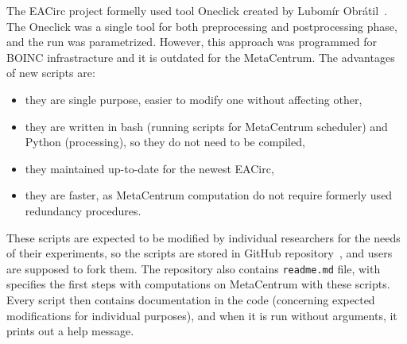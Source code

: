 \documentclass[
  print, %
  Table,   %
  nolof,     %
  nolot,     %
  11pt, %
  oneside  %
]{fithesis3}
\begin{document}
The EACirc project formelly used tool Oneclick created by Lubomír Obrátil~\cite{obratilBcThesis}. The Oneclick was a single tool for both preprocessing and postprocessing phase, and the run was parametrized. However, this approach was programmed for BOINC infrastracture and it is outdated for the MetaCentrum. The advantages of new scripts are: 

\begin{itemize}
    \item they are single purpose, easier to modify one without affecting other,
    \item they are written in bash (running scripts for MetaCentrum scheduler) and Python (processing), so they do not need to be compiled,
    \item they maintained up-to-date for the newest EACirc,
    \item they are faster, as MetaCentrum computation do not require formerly used redundancy procedures.
\end{itemize}

These scripts are expected to be modified by individual researchers for the needs of their experiments, so the scripts are stored in GitHub repository~\cite{eaUtils}, and users are supposed to fork them. The repository also contains \texttt{readme.md} file, with specifies the first steps with computations on MetaCentrum with these scripts. Every script then contains documentation in the code (concerning expected modifications for individual purposes), and when it is run without arguments, it prints out a help message.
\end{document}
